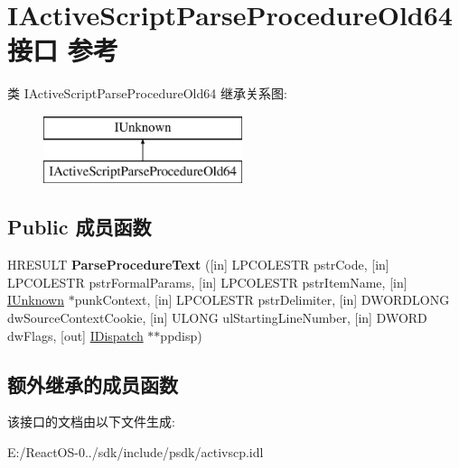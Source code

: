 \hypertarget{interface_i_active_script_parse_procedure_old64}{}\section{I\+Active\+Script\+Parse\+Procedure\+Old64接口 参考}
\label{interface_i_active_script_parse_procedure_old64}
类 I\+Active\+Script\+Parse\+Procedure\+Old64 继承关系图\+:\begin{figure}[H]
\begin{center}
\leavevmode
\includegraphics[height=2.000000cm]{interface_i_active_script_parse_procedure_old64}
\end{center}
\end{figure}
\subsection*{Public 成员函数}
\begin{DoxyCompactItemize}
\item 
\mbox{\label{interface_i_active_script_parse_procedure_old64_ab15472d1dbed55d8068d04366a455920}} 
H\+R\+E\+S\+U\+LT {\bfseries Parse\+Procedure\+Text} (\mbox{[}in\mbox{]} L\+P\+C\+O\+L\+E\+S\+TR pstr\+Code, \mbox{[}in\mbox{]} L\+P\+C\+O\+L\+E\+S\+TR pstr\+Formal\+Params, \mbox{[}in\mbox{]} L\+P\+C\+O\+L\+E\+S\+TR pstr\+Item\+Name, \mbox{[}in\mbox{]} \hyperlink{interface_i_unknown}{I\+Unknown} $\ast$punk\+Context, \mbox{[}in\mbox{]} L\+P\+C\+O\+L\+E\+S\+TR pstr\+Delimiter, \mbox{[}in\mbox{]} D\+W\+O\+R\+D\+L\+O\+NG dw\+Source\+Context\+Cookie, \mbox{[}in\mbox{]} U\+L\+O\+NG ul\+Starting\+Line\+Number, \mbox{[}in\mbox{]} D\+W\+O\+RD dw\+Flags, \mbox{[}out\mbox{]} \hyperlink{interface_i_dispatch}{I\+Dispatch} $\ast$$\ast$ppdisp)
\end{DoxyCompactItemize}
\subsection*{额外继承的成员函数}


该接口的文档由以下文件生成\+:\begin{DoxyCompactItemize}
\item 
E\+:/\+React\+O\+S-\/0../sdk/include/psdk/activscp.\+idl\end{DoxyCompactItemize}
